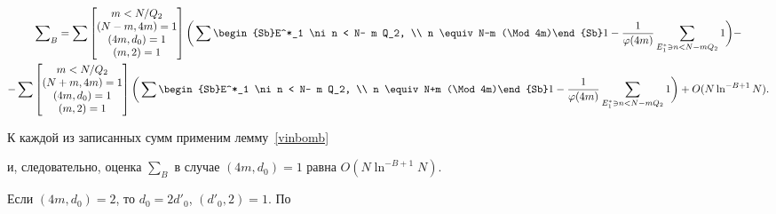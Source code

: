 \begin{multline*}


\sum\nolimits_B


= \sum 


\begin{bmatrix}


m < N/Q_2\\ (N-m, 4m)=1\\ (4m, d_0)=1\\ (m,2)=1


\end{bmatrix}


\bigg( \sum\begin{Sb}E^*_1 \ni n < N- m Q_2,


\\ n \equiv N-m (\Mod 4m)\end{Sb} 1


- \frac1{\varphi(4m)} \sum_{E^*_1 \ni n < N- m Q_2} 1\bigg ) -\\


%


- \sum 


\begin{bmatrix}


m < N/Q_2\\ (N+m, 4m)=1\\ (4 m, d_0)=1\\ (m,2)=1


\end{bmatrix}


\bigg ( \sum\begin{Sb}E^*_1 \ni n < N- m Q_2,


\\ n \equiv N+m (\Mod 4m)\end{Sb} 1


- \frac1{\varphi(4m)} \sum_{E^*_1 \ni n < N- m Q_2} 1\bigg )


+ O ( N \ln^{-B+1} N ).


\end{multline*}





К каждой из записанных сумм применим лемму~\ref{vinbomb}


и, следовательно, оценка $\sum_B$ в случае $(4m,d_0)=1$ равна $O


( N \ln^{-B+1} N )$.





Если $(4m,d_0)=2$, то $d_0 = 2 d'_0$, $(d'_0, 2)=1$. По


